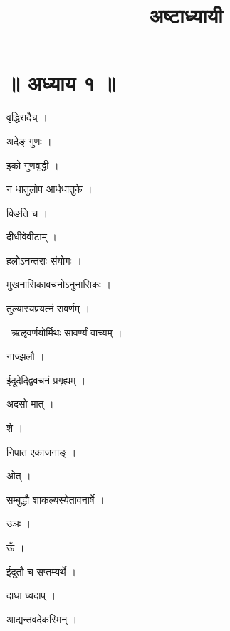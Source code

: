 \documentclass[10pt, openany, oneside]{book}
\title{अष्टाध्यायी }
\date{}
\begin{document}
\maketitle

\section*{॥ अध्याय १ ॥}

\noindent वृद्धिरादैच् ।

\noindent अदेङ् गुणः ।

\noindent इको गुणवृद्धी ।

\noindent न धातुलोप आर्धधातुके ।

\noindent क्ङिति च ।

\noindent दीधीवेवीटाम् ।

\noindent हलोऽनन्तराः संयोगः ।

\noindent मुखनासिकावचनोऽनुनासिकः ।

\noindent तुल्यास्यप्रयत्नं सवर्णम् ।

\par\noindent\hspace{1.5em}{\vps वा॰}~{\qt ऋऌवर्णयोर्मिथः सावर्ण्यं वाच्यम् ।}

\noindent नाज्झलौ ।

\noindent ईदूदेद्द्विवचनं प्रगृह्यम् ।

\noindent अदसो मात् ।

\noindent शे ।

\noindent निपात एकाजनाङ् ।

\noindent ओत् ।

\noindent सम्बुद्धौ शाकल्यस्येतावनार्षे ।

\noindent उञः ।

\noindent ऊँ ।

\noindent ईदूतौ च सप्तम्यर्थे ।

\noindent दाधा घ्वदाप् ।

\noindent आद्यन्तवदेकस्मिन् ।
\end{document}

